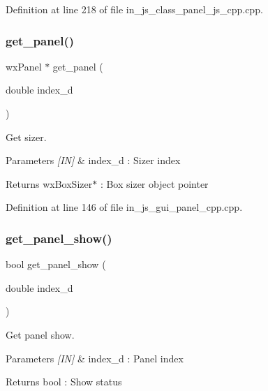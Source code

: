Definition at line 218 of file in\+\_\+js\+\_\+class\+\_\+panel\+\_\+js\+\_\+cpp.\+cpp.

\mbox{\label{group___panel_ga90edbd17cb06193898dc67904b748a12}} 
\subsubsection{get\_panel()}
{\footnotesize\ttfamily wx\+Panel $\ast$ get\+\_\+panel (\begin{DoxyParamCaption}\item[{double}]{index\+\_\+d }\end{DoxyParamCaption})}



Get sizer. 


\begin{DoxyParams}{Parameters}
{\em \mbox{[}\+I\+N\mbox{]}} & index\+\_\+d \+: Sizer index \\
\hline
\end{DoxyParams}
\begin{DoxyReturn}{Returns}
wx\+Box\+Sizer$\ast$ \+: Box sizer object pointer 
\end{DoxyReturn}


Definition at line 146 of file in\+\_\+js\+\_\+gui\+\_\+panel\+\_\+cpp.\+cpp.

\mbox{\label{group___panel_ga1fe8a261f9b782c059f0fac4a6990ca4}} 
\subsubsection{get\_panel\_show()}
{\footnotesize\ttfamily bool get\+\_\+panel\+\_\+show (\begin{DoxyParamCaption}\item[{double}]{index\+\_\+d }\end{DoxyParamCaption})}



Get panel show. 


\begin{DoxyParams}{Parameters}
{\em \mbox{[}\+I\+N\mbox{]}} & index\+\_\+d \+: Panel index \\
\hline
\end{DoxyParams}
\begin{DoxyReturn}{Returns}
bool \+: Show status 
\end{DoxyReturn}


